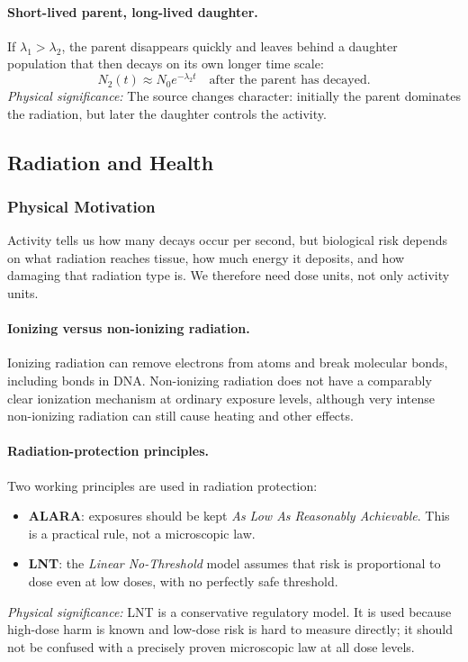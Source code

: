 \paragraph{Short-lived parent, long-lived daughter.}
If \(\lambda_1>\lambda_2\), the parent disappears quickly and leaves behind a
daughter population that then decays on its own longer time scale:
\begin{equation}
  \label{eq:lec05:short_parent_limit}
  \boxed{N_2(t)\approx N_0e^{-\lambda_2t}\quad
  \text{after the parent has decayed}.}
\end{equation}
\textit{Physical significance:} The source changes character: initially the
parent dominates the radiation, but later the daughter controls the activity.

\subsection{Radiation and Health}
\label{subsec:lec05:radiation_health}

\subsubsection*{Physical Motivation}
Activity tells us how many decays occur per second, but biological risk depends
on what radiation reaches tissue, how much energy it deposits, and how damaging
that radiation type is.  We therefore need dose units, not only activity units.

\paragraph{Ionizing versus non-ionizing radiation.}
Ionizing radiation can remove electrons from atoms and break molecular bonds,
including bonds in DNA.  Non-ionizing radiation does not have a comparably clear
ionization mechanism at ordinary exposure levels, although very intense
non-ionizing radiation can still cause heating and other effects.

\paragraph{Radiation-protection principles.}
Two working principles are used in radiation protection:
\begin{itemize}
  \item \textbf{ALARA}: exposures should be kept \emph{As Low As Reasonably
  Achievable}.  This is a practical rule, not a microscopic law.
  \item \textbf{LNT}: the \emph{Linear No-Threshold} model assumes that risk is
  proportional to dose even at low doses, with no perfectly safe threshold.
\end{itemize}
\textit{Physical significance:} LNT is a conservative regulatory model.  It is
used because high-dose harm is known and low-dose risk is hard to measure
directly; it should not be confused with a precisely proven microscopic law at
all dose levels.

